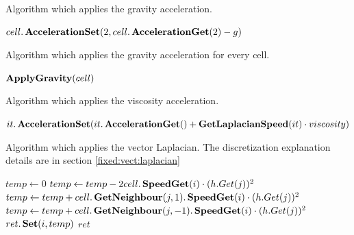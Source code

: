 \begin{algorithm}
\caption{Algorithm which applies the gravity acceleration.}
\label{code:ApplyGravity}
\begin{algorithmic}[1]
		\State $cell.\mathop{\textbf{AccelerationSet}}(2,cell.\mathop{\textbf{AccelerationGet}}(2)-g)$ 
		\EndIf
\EndFunction
	\end{algorithmic}
\end{algorithm}

\begin{algorithm}
\caption{Algorithm which applies the gravity acceleration for every cell.}
\label{code:ApplyGravityCell}
\begin{algorithmic}[1]
		\State $\mathop{\textbf{ApplyGravity}}(cell)$
		\EndFor
\EndProcedure
	\end{algorithmic}
\end{algorithm}

\begin{algorithm}
\caption{Algorithm which applies the viscosity acceleration.}
\label{code:ApplyViscosity}
\begin{algorithmic}[1]
				\State $it.\mathop{\textbf{AccelerationSet}}(it.\mathop{\textbf{AccelerationGet}}()+\mathop{\textbf{GetLaplacianSpeed}}(it)\cdot viscosity)$
			\EndIf
		\EndFor
	\EndProcedure
	\end{algorithmic}
\end{algorithm}

\begin{algorithm}
\caption{Algorithm which applies the vector Laplacian. The discretization explanation details are in section \ref{fixed:vect:laplacian}}
\label{code:GetLaplacianSpeed}
\begin{algorithmic}[1]
		\State $temp \gets 0$
				\State $temp\gets temp-2cell.\mathop{\textbf{SpeedGet}}(i)\cdot (h.Get(j))^2$
				\State $temp\gets temp+cell.\mathop{\textbf{GetNeighbour}}(j,1).\mathop{\textbf{SpeedGet}}(i)\cdot (h.Get(j))^2$
				\State $temp \gets temp+cell.\mathop{\textbf{GetNeighbour}}(j,-1).\mathop{\textbf{SpeedGet}}(i)\cdot (h.Get(j))^2$
			\EndFor
			\State $ret.\mathop{\textbf{Set}}(i,temp)$
		\EndFor
		\State \Return $ret$ 
	\EndFunction
	\end{algorithmic}
\end{algorithm}



